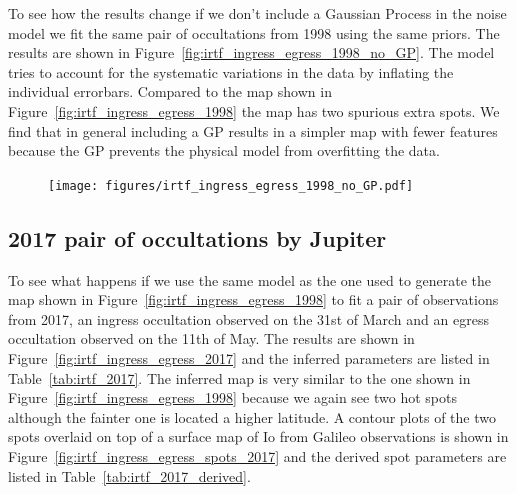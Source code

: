 \documentclass[modern]{aastex62}
\begin{document}
To see how the results change if we don't include a Gaussian Process in the noise model we fit the same pair of occultations from 1998 using the same priors.
The results are shown in Figure~\ref{fig:irtf_ingress_egress_1998_no_GP}.
The model tries to account for the systematic variations in the data by inflating the individual errorbars.
Compared to the map shown in Figure~\ref{fig:irtf_ingress_egress_1998} the map has two spurious extra spots. 
We find that in general including a GP results in a simpler map with fewer features because the GP prevents the physical model from overfitting the data.

\begin{figure}[ht!]
    \begin{centering}
    \texttt{[image: figures/irtf\_ingress\_egress\_1998\_no\_GP.pdf]}
    \end{centering}
\end{figure}

\subsection{2017 pair of occultations by Jupiter}
To see what happens if we use the same model as the one used to generate the map shown in Figure~\ref{fig:irtf_ingress_egress_1998} to fit a pair of observations from 2017, an ingress occultation observed on the 31st of March and an egress occultation observed on the 11th of May.
The results are shown in Figure~\ref{fig:irtf_ingress_egress_2017} and the inferred parameters are listed in Table~\ref{tab:irtf_2017}.
The inferred map is very similar to the one shown in Figure~\ref{fig:irtf_ingress_egress_1998} because we again see two hot spots although the fainter one is located a higher latitude.
A contour plots of the two spots overlaid on top of a surface map of Io from Galileo observations is shown in Figure~\ref{fig:irtf_ingress_egress_spots_2017} and the derived spot parameters are listed in Table~\ref{tab:irtf_2017_derived}.
\end{document}
